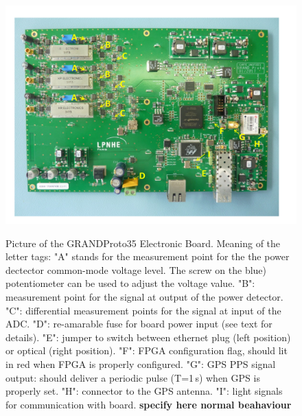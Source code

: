 \begin{figure}[t!]
\begin{center}
{
\includegraphics[width=\textwidth]{plots/GP35_FEU.pdf}  
}
\end{center}
\caption{Picture of the GRANDProto35 Electronic Board. Meaning of the letter tags: "A" stands for the measurement point for the the power dectector common-mode voltage level. The screw on the blue) potentiometer can be used to adjust the voltage value. "B": measurement point for the signal at output of the power detector. "C": differential measurement points for the signal at input of the ADC. "D": re-amarable fuse for board power input (see text for details). "E": jumper to switch between ethernet plug (left position) or optical (right position). "F": FPGA configuration flag, should lit in red when FPGA is properly configured. "G": GPS PPS signal output: should deliver a periodic pulse (T=1\,s) when GPS is properly set. "H": connector to the GPS antenna. "I": light signals for communication with board. {\bf specify here normal beahaviour}  
}
\label{fig:board} 
\end{figure}


